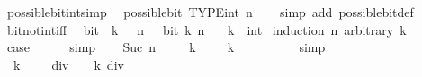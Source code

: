 \begin{isabellebody}
\endisatagproof
{\isafoldproof}%
%
\isadelimproof
\isanewline
%
\endisadelimproof
\isanewline
{}\isamarkupfalse%
\isanewline
\isanewline
{}\isamarkupfalse%
\ possible{\isacharunderscore}{\kern0pt}bit{\isacharunderscore}{\kern0pt}int{\isacharbrackleft}{\kern0pt}simp{\isacharbrackright}{\kern0pt}{\isacharcolon}{\kern0pt}\isanewline
\ \ {\isachardoublequoteopen}possible{\isacharunderscore}{\kern0pt}bit\ TYPE{\isacharparenleft}{\kern0pt}int{\isacharparenright}{\kern0pt}\ n{\isachardoublequoteclose}\isanewline
%
\isadelimproof
\ \ %
\endisadelimproof
%
\isatagproof
{}\isamarkupfalse%
\ {\isacharparenleft}{\kern0pt}simp\ add{\isacharcolon}{\kern0pt}\ possible{\isacharunderscore}{\kern0pt}bit{\isacharunderscore}{\kern0pt}def{\isacharparenright}{\kern0pt}%
\endisatagproof
{\isafoldproof}%
%
\isadelimproof
\isanewline
%
\endisadelimproof
\isanewline
{}\isamarkupfalse%
\ bit{\isacharunderscore}{\kern0pt}not{\isacharunderscore}{\kern0pt}int{\isacharunderscore}{\kern0pt}iff{\isacharprime}{\kern0pt}{\isacharcolon}{\kern0pt}\isanewline
\ \ {\isacartoucheopen}bit\ {\isacharparenleft}{\kern0pt}{\isacharminus}{\kern0pt}\ k\ {\isacharminus}{\kern0pt}\ {}{\isacharparenright}{\kern0pt}\ n\ {\isasymlongleftrightarrow}\ {\isasymnot}\ bit\ k\ n{\isacartoucheclose}\isanewline
\ \ \ k\ {\isacharcolon}{\kern0pt}{\isacharcolon}{\kern0pt}\ int\isanewline
%
\isadelimproof
%
\endisadelimproof
%
\isatagproof
{}\isamarkupfalse%
\ {\isacharparenleft}{\kern0pt}induction\ n\ arbitrary{\isacharcolon}{\kern0pt}\ k{\isacharparenright}{\kern0pt}\isanewline
\ \ \isamarkupfalse%
\ {}\isanewline
\ \ \isamarkupfalse%
\ {\isacharquery}{\kern0pt}case\isanewline
\ \ \ \ \isamarkupfalse%
\ simp\isanewline
{}\isamarkupfalse%
\isanewline
\ \ \isamarkupfalse%
\ {\isacharparenleft}{\kern0pt}Suc\ n{\isacharparenright}{\kern0pt}\isanewline
\ \ \isamarkupfalse%
\ {\isacartoucheopen}{\isacharminus}{\kern0pt}\ k\ {\isacharminus}{\kern0pt}\ {}\ {\isacharequal}{\kern0pt}\ {\isacharminus}{\kern0pt}\ {\isacharparenleft}{\kern0pt}k\ {\isacharplus}{\kern0pt}\ {}{\isacharparenright}{\kern0pt}\ {\isacharplus}{\kern0pt}\ {}{\isacartoucheclose}\isanewline
\ \ \ \ \isamarkupfalse%
\ simp\isanewline
\ \ \isamarkupfalse%
\ \isamarkupfalse%
\ {\isacartoucheopen}{\isacharparenleft}{\kern0pt}{\isacharminus}{\kern0pt}\ {\isacharparenleft}{\kern0pt}k\ {\isacharplus}{\kern0pt}\ {}{\isacharparenright}{\kern0pt}\ {\isacharplus}{\kern0pt}\ {}{\isacharparenright}{\kern0pt}\ div\ {}\ {\isacharequal}{\kern0pt}\ {\isacharminus}{\kern0pt}\ {\isacharparenleft}{\kern0pt}k\ div\ {}{\isacharparenright}{\kern0pt}\ {\isacharminus}{\kern0pt}\ {}{\isacartoucheclose}\isanewline

\end{isabellebody}
